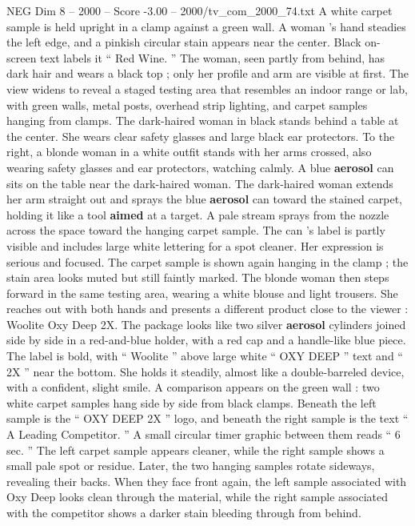 \begin{textsample}{NEG Dim 8 – 2000 – Score -3.00 – 2000/tv\_com\_2000\_74.txt}  \label{ex:f8_neg_084}
A white carpet sample is held upright in a clamp against a green wall.
A woman ’s hand steadies the left edge, and a pinkish circular stain appears near the center.
Black on-screen text labels it “ Red Wine. ” The woman, seen partly from behind, has dark hair and wears a black top ; only her profile and arm are visible at first.
The view widens to reveal a staged testing area that resembles an indoor range or lab, with green walls, metal posts, overhead strip lighting, and carpet samples hanging from clamps.
The dark-haired woman in black stands behind a table at the center.
She wears clear safety glasses and large black ear protectors.
To the right, a blonde woman in a white outfit stands with her arms crossed, also wearing safety glasses and ear protectors, watching calmly.
A blue \textbf{aerosol} can sits on the table near the dark-haired woman.
The dark-haired woman extends her arm straight out and sprays the blue \textbf{aerosol} can toward the stained carpet, holding it like a tool \textbf{aimed} at a target.
A pale stream sprays from the nozzle across the space toward the hanging carpet sample.
The can ’s label is partly visible and includes large white lettering for a spot cleaner.
Her expression is serious and focused.
The carpet sample is shown again hanging in the clamp ; the stain area looks muted but still faintly marked.
The blonde woman then steps forward in the same testing area, wearing a white blouse and light trousers.
She reaches out with both hands and presents a different product close to the viewer : Woolite Oxy Deep 2X.
The package looks like two silver \textbf{aerosol} cylinders joined side by side in a red-and-blue holder, with a red cap and a handle-like blue piece.
The label is bold, with “ Woolite ” above large white “ OXY DEEP ” text and “ 2X ” near the bottom.
She holds it steadily, almost like a double-barreled device, with a confident, slight smile.
A comparison appears on the green wall : two white carpet samples hang side by side from black clamps.
Beneath the left sample is the “ OXY DEEP 2X ” logo, and beneath the right sample is the text “ A Leading Competitor. ” A small circular timer graphic between them reads “ 6 sec. ” The left carpet sample appears cleaner, while the right sample shows a small pale spot or residue.
Later, the two hanging samples rotate sideways, revealing their backs.
When they face front again, the left sample associated with Oxy Deep looks clean through the material, while the right sample associated with the competitor shows a darker stain bleeding through from behind.

\end{textsample}
